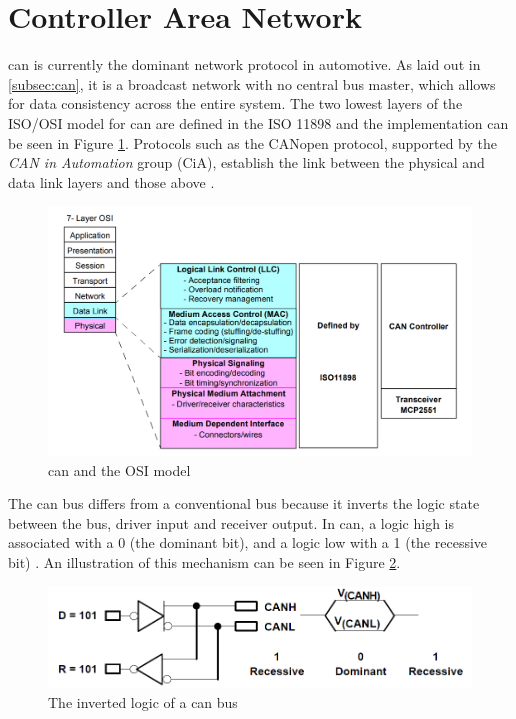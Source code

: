\section{Controller Area Network}
\label{s:can}

\gls{can} is currently the dominant network protocol in automotive. As laid out in \ref{subsec:can}, it is a broadcast network with no central bus master, which allows for data consistency across the entire system. The two lowest layers of the ISO/OSI model for \gls{can} are defined in the ISO 11898 \citep{Richards2002} and the implementation can be seen in Figure \ref{fig:CAN_ISO}. Protocols such as the CANopen protocol, supported by the \emph{CAN in Automation} group (CiA), establish the link between the physical and data link layers and those above \citep{Corrigan2002}.

\begin{figure}
    \centering
    \includegraphics[width = \textwidth]{img/parts/introduction/CAN ISO.png}
    \caption{\gls{can} and the OSI model \citep{Richards2002}}
    \label{fig:CAN_ISO}
\end{figure}

The \gls{can} bus differs from a conventional bus because it inverts the logic state between the bus, driver input and receiver output. In \gls{can}, a logic high is associated with a 0 (the dominant bit), and a logic low with a 1 (the recessive bit) \citep{Corrigan2002}. An illustration of this mechanism can be seen in Figure \ref{fig:CAN_Bus_Logic}.

\begin{figure}
    \centering
    \includegraphics[width = \textwidth]{img/parts/introduction/CAN Bus Logic.png}
    \caption{The inverted logic of a \gls{can} bus \citep{Corrigan2002}}
    \label{fig:CAN_Bus_Logic}
\end{figure}

